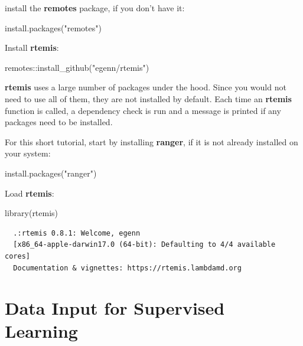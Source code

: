 \documentclass[
]{book}
\newenvironment{Shaded}{\begin{snugshade}}{\end{snugshade}}
\newcommand{\FunctionTok}[1]{\textcolor[rgb]{0.00,0.00,0.00}{#1}}
\newcommand{\NormalTok}[1]{#1}
\newcommand{\SpecialCharTok}[1]{\textcolor[rgb]{0.00,0.00,0.00}{#1}}
\newcommand{\StringTok}[1]{\textcolor[rgb]{0.31,0.60,0.02}{#1}}
\begin{document}
install the \textbf{remotes} package, if you don't have it:

\begin{Shaded}
\begin{Highlighting}[]
\FunctionTok{install.packages}\NormalTok{(}\StringTok{"remotes"}\NormalTok{)}
\end{Highlighting}
\end{Shaded}

Install \textbf{rtemis}:

\begin{Shaded}
\begin{Highlighting}[]
\NormalTok{remotes}\SpecialCharTok{::}\FunctionTok{install\_github}\NormalTok{(}\StringTok{"egenn/rtemis"}\NormalTok{)}
\end{Highlighting}
\end{Shaded}

\textbf{rtemis} uses a large number of packages under the hood. Since you would not need to use all of them, they are not installed by default. Each time an \textbf{rtemis} function is called, a dependency check is run and a message is printed if any packages need to be installed.

For this short tutorial, start by installing \textbf{ranger}, if it is not already installed on your system:

\begin{Shaded}
\begin{Highlighting}[]
\FunctionTok{install.packages}\NormalTok{(}\StringTok{"ranger"}\NormalTok{)}
\end{Highlighting}
\end{Shaded}

Load \textbf{rtemis}:

\begin{Shaded}
\begin{Highlighting}[]
\FunctionTok{library}\NormalTok{(rtemis)}
\end{Highlighting}
\end{Shaded}

\begin{verbatim}
  .:rtemis 0.8.1: Welcome, egenn
  [x86_64-apple-darwin17.0 (64-bit): Defaulting to 4/4 available cores]
  Documentation & vignettes: https://rtemis.lambdamd.org
\end{verbatim}

\hypertarget{data-input-for-supervised-learning}{%
\section{Data Input for Supervised Learning}\label{data-input-for-supervised-learning}}
\end{document}
